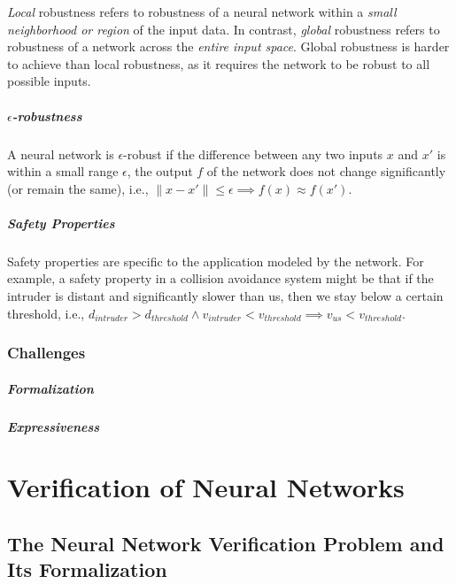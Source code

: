 \documentclass[oneside,11pt,dvipsnames]{book}
\begin{document}
\emph{Local} robustness refers to robustness of a neural network within a \emph{small neighborhood or region} of the input data. In contrast, \emph{global} robustness refers to robustness of a network across the \emph{entire input space}. Global robustness is harder to achieve than local robustness, as it requires the network to be robust to all possible inputs.

\paragraph{$\epsilon$-robustness} A neural network is $\epsilon$-robust if the difference between any two inputs $x$ and $x'$ is within a small range $\epsilon$, the output $f$ of the network does not change significantly (or remain the same), i.e., $\|x-x'\| \leq \epsilon \implies f(x) \approx f(x')$.




\paragraph{Safety Properties} Safety properties are specific to the application modeled by the network. For example, a safety property in a collision avoidance system might be that if the intruder is distant and significantly slower than us, then we stay below a certain threshold, i.e., $d_{intruder} > d_{threshold} \land v_{intruder} < v_{threshold} \implies v_{us} < v_{threshold}$.


\subsection{Challenges}

\paragraph{Formalization}


\paragraph{Expressiveness}




\chapter{Verification of Neural Networks}\label{sec:verification}


\section{The Neural Network Verification Problem and Its Formalization}
\end{document}
